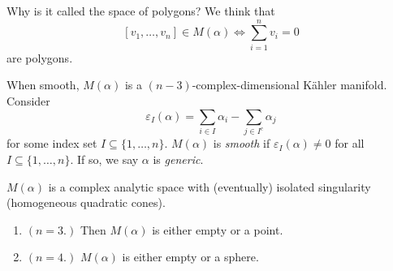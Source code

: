 Why is it called the space of polygons?
We think that
$$
[v_1,\ldots,v_n] \in M(\alpha) \iff
\sum_{i=1}^nv_i=0
$$
are polygons.

When smooth, $M(\alpha)$ is a
$(n-3)$-complex-dimensional
Kähler manifold. Consider
$$
\varepsilon_I(\alpha)=\sum_{i \in I}\alpha_i
-\sum_{j \in I^c}\alpha_j
$$
for some index set $I \subseteq \{1,\ldots,
n\}$.
$M(\alpha)$ is {\it smooth} if
$\varepsilon_I(\alpha)
\neq 0$ for all $I\subseteq \{1,\ldots,n\}$.
If so, we say $\alpha$ is {\it generic}.

\begin{theorem}
\label{theorem-Kapovich-Millson}
$M(\alpha)$ is a complex analytic space
with (eventually) isolated singularity
(homogeneous quadratic cones).
\end{theorem}

\begin{example}
\label{examples-polygon-moduli-spaces}
\begin{enumerate}
\item $(n=3.)$ Then $M(\alpha)$ is either
empty or a point.

\item $(n=4.)$ $M(\alpha)$ is either empty or
a sphere.
\end{enumerate}
\end{example}

